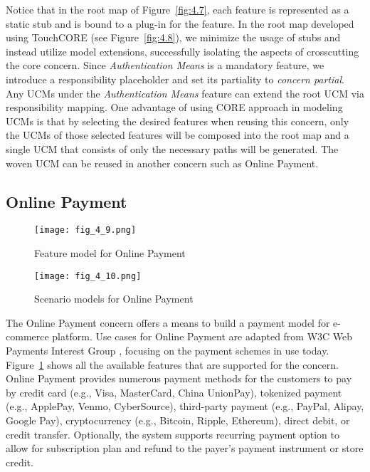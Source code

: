 Notice that in the root map of Figure~\ref{fig:4.7}, each feature is represented as a static stub and is bound to a plug-in for the feature. In the root map developed using TouchCORE (see Figure~\ref{fig:4.8}), we minimize the usage of stubs and instead utilize model extensions, successfully isolating the aspects of crosscutting the core concern. Since \emph{Authentication Means} is a mandatory feature, we introduce a responsibility placeholder and set its partiality to \emph{concern partial}. Any UCMs under the \emph{Authentication Means} feature can extend the root UCM via responsibility mapping. One advantage of using CORE approach in modeling UCMs is that by selecting the desired features when reusing this concern, only the UCMs of those selected features will be composed into the root map and a single UCM that consists of only the necessary paths will be generated. The woven UCM can be reused in another concern such as Online Payment.


\subsection{Online Payment}

\begin{figure}[h]
	\centering
	\texttt{[image: fig\_4\_9.png]}
	\caption{Feature model for Online Payment}
	\label{fig:4.9}
\end{figure}

\begin{figure}
	\centering
	\texttt{[image: fig\_4\_10.png]}
	\caption{Scenario models for Online Payment}
	\label{fig:4.10}
\end{figure}

The Online Payment concern offers a means to build a payment model for e-commerce platform. Use cases for Online Payment are adapted from W3C Web Payments Interest Group \cite{w3c2015web}, focusing on the payment schemes in use today. Figure~\ref{fig:4.9} shows all the available features that are supported for the concern. Online Payment provides numerous payment methods for the customers to pay by credit card (e.g., Visa, MasterCard, China UnionPay), tokenized payment (e.g., ApplePay, Venmo, CyberSource), third-party payment (e.g., PayPal, Alipay, Google Pay), cryptocurrency (e.g., Bitcoin, Ripple, Ethereum), direct debit, or credit transfer. Optionally, the system supports recurring payment option to allow for subscription plan and refund to the payer's payment instrument or store credit.

